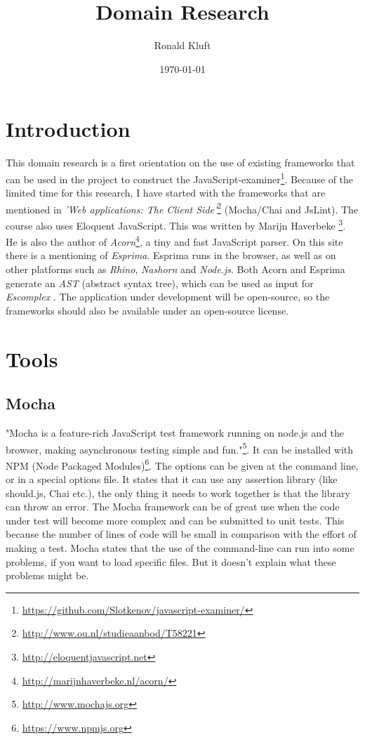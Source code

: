 \documentclass{article}
\begin{document}
\title{Domain Research}
\author{Ronald Kluft}
\date{\today}
\maketitle

\section{Introduction}
This domain research is a first orientation on the use of existing frameworks that can be used in the 
project to construct the JavaScript-examiner\footnote{\url{https://github.com/Slotkenov/javascript-examiner/}}.
Because of the limited time for this research, I have started with the frameworks that are mentioned in 
{\em'Web applications: The Client Side'}\footnote{\url{http://www.ou.nl/studieaanbod/T58221}} (Mocha/Chai and JsLint).
The course also uses Eloquent JavaScript. This was written by Marijn Haverbeke \footnote{\url{http://eloquentjavascript.net}}.
He is also the author of {\em Acorn}\footnote{\url{http://marijnhaverbeke.nl/acorn/}}, a tiny and fast JavaScript parser.
On this site there is a mentioning of {\em Esprima}. 
Esprima runs in the browser, as well as on other platforms such as {\em Rhino}, {\em Nashorn} and {\em Node.js}.
Both Acorn and Esprima generate an {\em AST} (abstract syntax tree), which can be used as input for {\em Escomplex }.
The application under development will be open-source, so the frameworks should also be available
under an open-source license.

\section{Tools}

\subsection{Mocha}
"Mocha is a feature-rich JavaScript test framework running on node.js and the 
browser, making asynchronous testing simple and fun."\footnote{\url{http://www.mochajs.org}}.
It can be installed with NPM (Node Packaged Modules)\footnote{\url{https://www.npmjs.org}}.
The options can be given at the command line, or in a special options file.
It states that it can use any assertion library (like should.js, Chai etc.), 
the only thing it needs to work together is that the library can throw an error.
The Mocha framework can be of great use when the code under test will become more complex and can be submitted to unit tests.
This because the number of lines of code will be small in comparison with the effort of making a test.
Mocha states that the use of the command-line can run into some problems, if you want to load specific files. 
But it doesn't explain what these problems might be.
\end{document}

